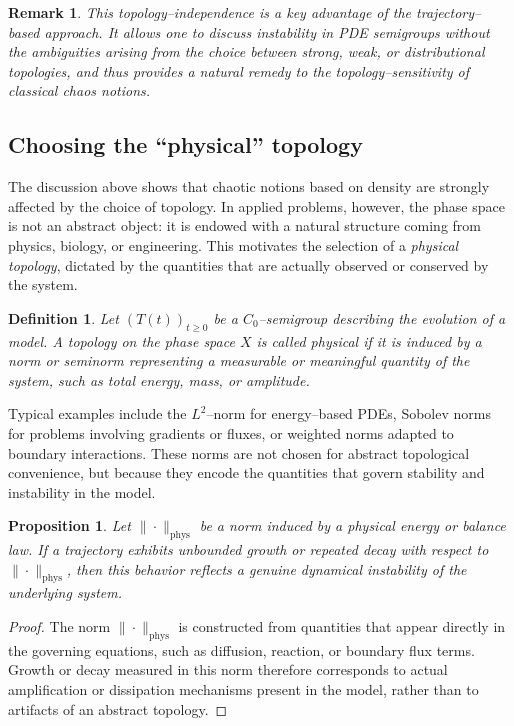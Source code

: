 \documentclass[12pt]{article}
\newtheorem{proposition}[theorem]{Proposition}
\newtheorem{definition}[theorem]{Definition}
\newtheorem{remark}[theorem]{Remark}
\begin{document}
\begin{remark}
This topology--independence is a key advantage of the trajectory--based approach. It allows one to discuss instability in PDE semigroups without the ambiguities arising from the choice between strong, weak, or distributional topologies, and thus provides a natural remedy to the topology--sensitivity of classical chaos notions.
\end{remark}

\subsection{Choosing the ``physical'' topology}

The discussion above shows that chaotic notions based on density are strongly affected by the choice of topology. In applied problems, however, the phase space is not an abstract object: it is endowed with a natural structure coming from physics, biology, or engineering. This motivates the selection of a \emph{physical topology}, dictated by the quantities that are actually observed
or conserved by the system.

\begin{definition}
Let $(T(t))_{t\ge 0}$ be a $C_0$--semigroup describing the evolution of a model. A topology on the phase space $X$ is called \emph{physical} if it is induced by a norm or seminorm representing a measurable or meaningful quantity of the system, such as total energy, mass, or amplitude.
\end{definition}

Typical examples include the $L^2$--norm for energy--based PDEs, Sobolev norms for problems involving gradients or fluxes, or weighted norms adapted to boundary interactions. These norms are not chosen for abstract topological convenience, but because they encode the quantities that govern stability and instability in the model.

\begin{proposition}\label{prop:physical_norm}
Let $\|\cdot\|_{\mathrm{phys}}$ be a norm induced by a physical energy or balance law. If a trajectory exhibits unbounded growth or repeated decay with respect to $\|\cdot\|_{\mathrm{phys}}$, then this behavior reflects a genuine dynamical instability of the underlying system.
\end{proposition}

\begin{proof}
The norm $\|\cdot\|_{\mathrm{phys}}$ is constructed from quantities that appear directly in the governing equations, such as diffusion, reaction, or boundary flux terms. Growth or decay measured in this norm therefore corresponds to actual amplification or dissipation mechanisms present in the model, rather than to artifacts of an abstract topology.
\end{proof}
\end{document}
